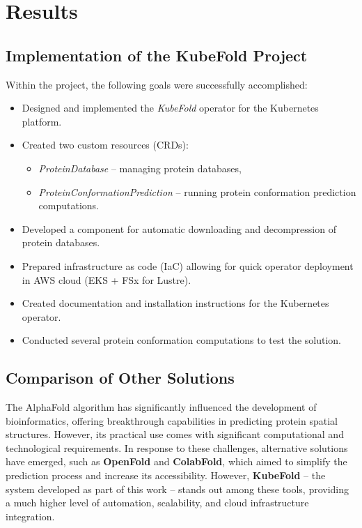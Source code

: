 \chapter{Results}

\section{Implementation of the KubeFold Project}

Within the project, the following goals were successfully accomplished:
\begin{itemize}
    \item Designed and implemented the \textit{KubeFold} operator for the Kubernetes platform.
    \item Created two custom resources (CRDs):
    \begin{itemize}
        \item \textit{ProteinDatabase} – managing protein databases,
        \item \textit{ProteinConformationPrediction} – running protein conformation prediction computations.
    \end{itemize}
    \item Developed a component for automatic downloading and decompression of protein databases.
    \item Prepared infrastructure as code (IaC) allowing for quick operator deployment in AWS cloud (EKS + FSx for Lustre).
    \item Created documentation and installation instructions for the Kubernetes operator.
    \item Conducted several protein conformation computations to test the solution.
\end{itemize}


\section{Comparison of Other Solutions}

The AlphaFold algorithm has significantly influenced the development of bioinformatics, offering breakthrough capabilities in predicting protein spatial structures.
However, its practical use comes with significant computational and technological requirements.
In response to these challenges, alternative solutions have emerged, such as \textbf{OpenFold} and \textbf{ColabFold}, which aimed to simplify the prediction process and increase its accessibility.
However, \textbf{KubeFold} – the system developed as part of this work – stands out among these tools, providing a much higher level of automation, scalability, and cloud infrastructure integration.

